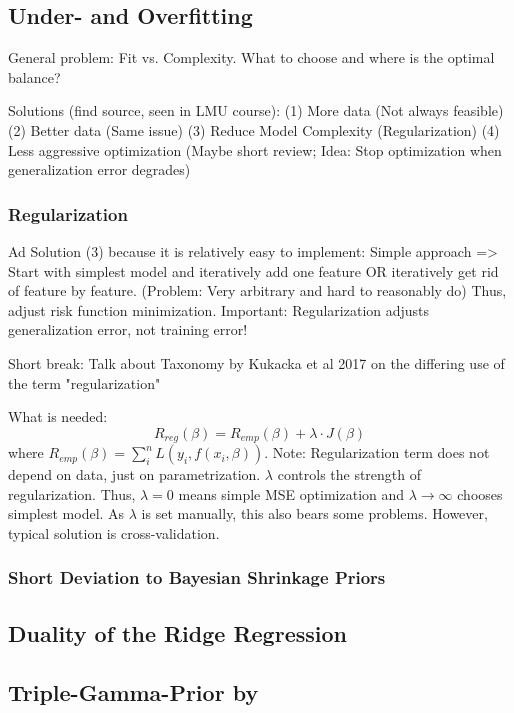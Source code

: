 \documentclass[12pt,a4paper]{article}
\begin{document}
\subsection{Under- and Overfitting}

General problem: Fit vs. Complexity. What to choose and where is the optimal balance?

Solutions (find source, seen in LMU course): (1) More data (Not always feasible) (2) Better data (Same issue) (3) Reduce Model Complexity (Regularization) (4) Less aggressive optimization (Maybe short review; Idea: Stop optimization when generalization error degrades)

\subsubsection{Regularization}
Ad Solution (3) because it is relatively easy to implement: Simple approach => Start with simplest model and iteratively add one feature OR iteratively get rid of feature by feature. (Problem: Very arbitrary and hard to reasonably do) Thus, adjust risk function minimization. Important: Regularization adjusts generalization error, not training error!

Short break: Talk about Taxonomy by Kukacka et al 2017 on the differing use of the term "regularization" 

What is needed: 
\[
R_{reg}(\beta) = R_{emp}(\beta)+ \lambda \cdot J(\beta)
\]
where $R_{emp}(\beta) = \sum_i^n L(y_i, f(x_i, \beta))$. Note: Regularization term does not depend on data, just on parametrization. $\lambda$ controls the strength of regularization. Thus, $\lambda = 0$ means simple MSE optimization and $\lambda \to \infty$ chooses simplest model. As $\lambda$ is set manually, this also bears some problems. However, typical solution is cross-validation. 
\subsubsection{Short Deviation to Bayesian Shrinkage Priors}

\subsection{Duality of the Ridge Regression}

\subsection{Triple-Gamma-Prior by \textcite{TGP2020}}
\end{document}
